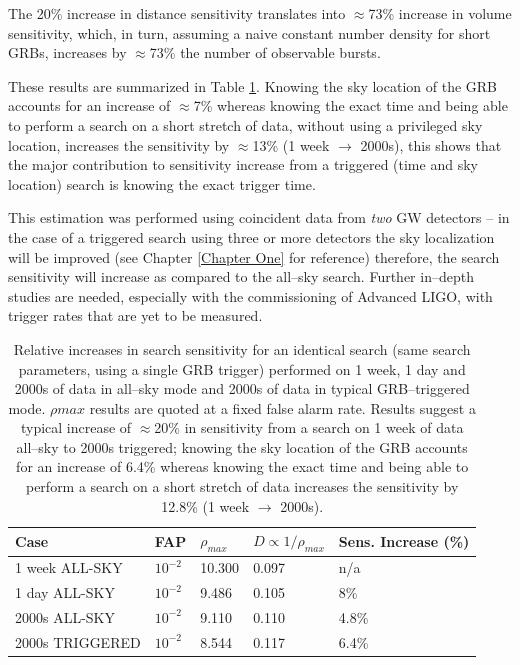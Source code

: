 The 20\% increase in distance sensitivity translates into $\approx$73\% increase in volume sensitivity, which, in turn, assuming a naive constant number density for short GRBs, increases by $\approx$73\% the number of observable bursts.

These results are summarized in Table \ref{trig_untrig_comp}. Knowing the sky location of the GRB accounts for an increase of $\approx$7\% whereas knowing the exact time and being able to perform a search on a short stretch of data, without using a privileged sky location, increases the sensitivity by $\approx$13\% (1 week $\rightarrow$ 2000s), this shows that the major contribution to sensitivity increase from a triggered (time and sky location) search is knowing the exact trigger time. 

This estimation was performed using coincident data from \emph{two} GW detectors -- in the case of a triggered search using three or more detectors the sky localization will be improved (see Chapter \ref{Chapter One} for reference) therefore, the search sensitivity will increase as compared to the all--sky search. Further in--depth studies are needed, especially with the commissioning of Advanced LIGO, with trigger rates that are yet to be measured.

\begin{table}[ht!]
 \begin{tabular}{|l|l|l|l|l|}
 \hline
 \hline
 Case & FAP & $\rho_{max}$ & $D \propto 1/\rho_{max}$ & Sens. Increase (\%) \\
 \hline
 1 week ALL-SKY & $10^{-2}$ & 10.300 & 0.097 & n/a \\
 1 day ALL-SKY & $10^{-2}$ & 9.486 & 0.105 & 8\% \\
 2000s ALL-SKY & $10^{-2}$ & 9.110 & 0.110 & 4.8\% \\
 2000s TRIGGERED & $10^{-2}$ & 8.544 & 0.117 & 6.4\% \\
 \hline
 \hline
 \end{tabular} 
 \caption{Relative increases in search sensitivity for an identical search (same search parameters, using a single GRB trigger) performed on 1 week, 1 day and 2000s of data in all--sky mode and 2000s of data in typical GRB--triggered mode. $\rho{max}$ results are quoted at a fixed false alarm rate. Results suggest a typical increase of $\approx$20\% in sensitivity from a search on 1 week of data all--sky to 2000s triggered; knowing the sky location of the GRB accounts for an increase of 6.4\% whereas knowing the exact time and being able to perform a search on a short stretch of data increases the sensitivity by 12.8\% (1 week $\rightarrow$ 2000s).}
 \label{trig_untrig_comp}
\end{table}

